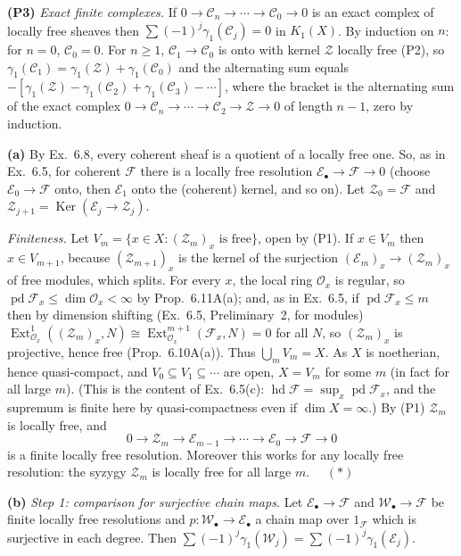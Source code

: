 \documentclass[11pt]{article}
\begin{document}
\textbf{(P3)} \emph{Exact finite complexes.} If $0\to\mathcal C_n\to\cdots\to\mathcal C_0\to0$ is an exact complex of locally free sheaves then $\sum(-1)^j\gamma_1(\mathcal C_j)=0$ in $K_1(X)$. By induction on $n$: for $n=0$, $\mathcal C_0=0$. For $n\ge1$, $\mathcal C_1\to\mathcal C_0$ is onto with kernel $\mathcal Z$ locally free (P2), so $\gamma_1(\mathcal C_1)=\gamma_1(\mathcal Z)+\gamma_1(\mathcal C_0)$ and the alternating sum equals $-[\gamma_1(\mathcal Z)-\gamma_1(\mathcal C_2)+\gamma_1(\mathcal C_3)-\cdots]$, where the bracket is the alternating sum of the exact complex $0\to\mathcal C_n\to\cdots\to\mathcal C_2\to\mathcal Z\to0$ of length $n-1$, zero by induction.

\textbf{(a)} By Ex.~6.8, every coherent sheaf is a quotient of a locally free one. So, as in Ex.~6.5, for coherent $\mathcal F$ there is a locally free resolution $\mathcal E_\bullet\to\mathcal F\to0$ (choose $\mathcal E_0\to\mathcal F$ onto, then $\mathcal E_1$ onto the (coherent) kernel, and so on). Let $\mathcal Z_0=\mathcal F$ and $\mathcal Z_{j+1}=\operatorname{Ker}(\mathcal E_j\to\mathcal Z_j)$.

\emph{Finiteness.} Let $V_m=\{x\in X:(\mathcal Z_m)_x\text{ is free}\}$, open by (P1). If $x\in V_m$ then $x\in V_{m+1}$, because $(\mathcal Z_{m+1})_x$ is the kernel of the surjection $(\mathcal E_m)_x\to(\mathcal Z_m)_x$ of free modules, which splits. For every $x$, the local ring $\mathcal O_x$ is regular, so $\operatorname{pd}\mathcal F_x\le\dim\mathcal O_x<\infty$ by Prop.~6.11A(a); and, as in Ex.~6.5, if $\operatorname{pd}\mathcal F_x\le m$ then by dimension shifting (Ex.~6.5, Preliminary~2, for modules) $\operatorname{Ext}^1_{\mathcal O_x}((\mathcal Z_m)_x,N)\cong\operatorname{Ext}^{m+1}_{\mathcal O_x}(\mathcal F_x,N)=0$ for all $N$, so $(\mathcal Z_m)_x$ is projective, hence free (Prop.~6.10A(a)). Thus $\bigcup_mV_m=X$. As $X$ is noetherian, hence quasi-compact, and $V_0\subseteq V_1\subseteq\cdots$ are open, $X=V_m$ for some $m$ (in fact for all large $m$). (This is the content of Ex.~6.5(c): $\operatorname{hd}\mathcal F=\sup_x\operatorname{pd}\mathcal F_x$, and the supremum is finite here by quasi-compactness even if $\dim X=\infty$.) By (P1) $\mathcal Z_m$ is locally free, and
\[
0\to\mathcal Z_m\to\mathcal E_{m-1}\to\cdots\to\mathcal E_0\to\mathcal F\to0
\]
is a finite locally free resolution. Moreover this works for any locally free resolution: the syzygy $\mathcal Z_m$ is locally free for all large $m$. $\quad(\ast)$

\textbf{(b)} \emph{Step 1: comparison for surjective chain maps.} Let $\mathcal E_\bullet\to\mathcal F$ and $\mathcal W_\bullet\to\mathcal F$ be finite locally free resolutions and $p\colon\mathcal W_\bullet\to\mathcal E_\bullet$ a chain map over $1_{\mathcal F}$ which is surjective in each degree. Then $\sum(-1)^j\gamma_1(\mathcal W_j)=\sum(-1)^j\gamma_1(\mathcal E_j)$.
\end{document}
